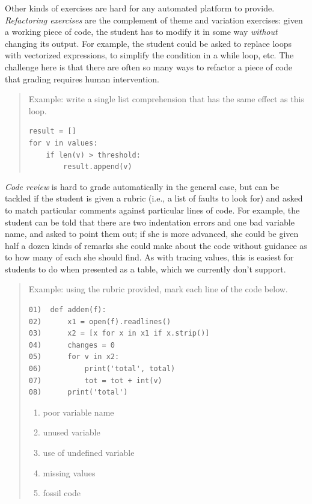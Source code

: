 \documentclass[10pt,statementpaper]{memoir}
\providecommand{\tightlist}{%
  \setlength{\itemsep}{0pt}\setlength{\parskip}{0pt}}
\begin{document}
Other kinds of exercises are hard for any automated platform to provide.
\emph{Refactoring exercises} are the complement of theme and variation
exercises: given a working piece of code, the student has to modify it
in some way \emph{without} changing its output. For example, the student
could be asked to replace loops with vectorized expressions, to simplify
the condition in a while loop, etc. The challenge here is that there are
often so many ways to refactor a piece of code that grading requires
human intervention.

\begin{quote}
Example: write a single list comprehension that has the same effect as
this loop.

\begin{verbatim}
result = []
for v in values:
    if len(v) > threshold:
        result.append(v)
\end{verbatim}
\end{quote}

\emph{Code review} is hard to grade automatically in the general case,
but can be tackled if the student is given a rubric (i.e., a list of
faults to look for) and asked to match particular comments against
particular lines of code. For example, the student can be told that
there are two indentation errors and one bad variable name, and asked to
point them out; if she is more advanced, she could be given half a dozen
kinds of remarks she could make about the code without guidance as to
how many of each she should find. As with tracing values, this is
easiest for students to do when presented as a table, which we currently
don't support.

\begin{quote}
Example: using the rubric provided, mark each line of the code below.

\begin{verbatim}
01)  def addem(f):
02)      x1 = open(f).readlines()
03)      x2 = [x for x in x1 if x.strip()]
04)      changes = 0
05)      for v in x2:
06)          print('total', total)
07)          tot = tot + int(v)
08)      print('total')
\end{verbatim}

\begin{enumerate}
\def\labelenumi{\arabic{enumi}.}
\tightlist
\item
  poor variable name
\item
  unused variable
\item
  use of undefined variable
\item
  missing values
\item
  fossil code
\end{enumerate}
\end{quote}
\end{document}
